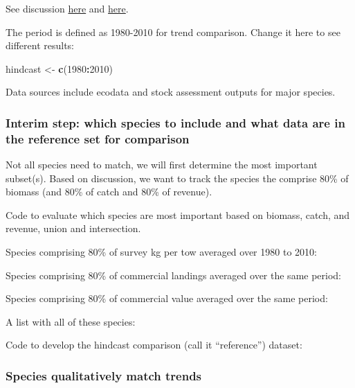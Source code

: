 \documentclass[
]{article}
\newenvironment{Shaded}{\begin{snugshade}}{\end{snugshade}}
\newcommand{\DecValTok}[1]{\textcolor[rgb]{0.00,0.00,0.81}{#1}}
\newcommand{\KeywordTok}[1]{\textcolor[rgb]{0.13,0.29,0.53}{\textbf{#1}}}
\newcommand{\NormalTok}[1]{#1}
\newcommand{\OperatorTok}[1]{\textcolor[rgb]{0.81,0.36,0.00}{\textbf{#1}}}
\newcommand{\StringTok}[1]{\textcolor[rgb]{0.31,0.60,0.02}{#1}}
\begin{document}
See discussion
\href{https://github.com/NOAA-EDAB/atneus_RM/issues/7}{here} and
\href{https://github.com/NOAA-EDAB/atneus_RM/wiki/Meeting-minutes\#20191002}{here}.

The period is defined as 1980-2010 for trend comparison. Change it here
to see different results:

\begin{Shaded}
\begin{Highlighting}[]
\NormalTok{hindcast <-}\StringTok{ }\KeywordTok{c}\NormalTok{(}\DecValTok{1980}\OperatorTok{:}\DecValTok{2010}\NormalTok{)}
\end{Highlighting}
\end{Shaded}

Data sources include ecodata and stock assessment outputs for major
species.

\hypertarget{interim-step-which-species-to-include-and-what-data-are-in-the-reference-set-for-comparison}{%
\subsubsection{Interim step: which species to include and what data are
in the reference set for
comparison}\label{interim-step-which-species-to-include-and-what-data-are-in-the-reference-set-for-comparison}}

Not all species need to match, we will first determine the most
important subset(s). Based on discussion, we want to track the species
the comprise 80\% of biomass (and 80\% of catch and 80\% of revenue).

Code to evaluate which species are most important based on biomass,
catch, and revenue, union and intersection.

Species comprising 80\% of survey kg per tow averaged over 1980 to 2010:

Species comprising 80\% of commercial landings averaged over the same
period:

Species comprising 80\% of commercial value averaged over the same
period:

A list with all of these species:

Code to develop the hindcast comparison (call it ``reference'') dataset:

\hypertarget{species-qualitatively-match-trends}{%
\subsubsection{Species qualitatively match
trends}\label{species-qualitatively-match-trends}}
\end{document}
